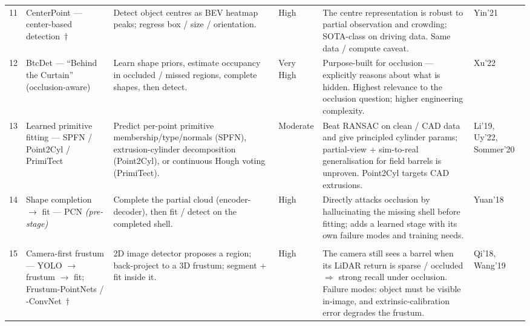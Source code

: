 \documentclass[10pt,a4paper]{article}
\newcommand{\stars}[1]{%
  \ifcase#1\or
  \ding{72}\ding{73}\ding{73}\ding{73}\ding{73}\or
  \ding{72}\ding{72}\ding{73}\ding{73}\ding{73}\or
  \ding{72}\ding{72}\ding{72}\ding{73}\ding{73}\or
  \ding{72}\ding{72}\ding{72}\ding{72}\ding{73}\or
  \ding{72}\ding{72}\ding{72}\ding{72}\ding{72}\fi}
\begin{document}
\begin{landscape}
\begin{longtable}{@{}R{0.5cm} R{3.3cm} R{6.7cm} R{2.2cm} R{7.0cm} R{2.5cm}@{}}
11 & CenterPoint --- center-based detection~$\dagger$ &
Detect object centres as BEV heatmap peaks; regress box / size / orientation. &
\stars{4}\newline High &
The centre representation is robust to partial observation and crowding; SOTA-class on driving data. Same data / compute caveat. &
Yin'21\\

12 & BtcDet --- ``Behind the Curtain'' (occlusion-aware) &
Learn shape priors, estimate occupancy in occluded / missed regions, complete shapes, then detect. &
\stars{5}\newline Very High &
Purpose-built for occlusion --- explicitly reasons about what is hidden. Highest relevance to the occlusion question; higher engineering complexity. &
Xu'22\\

13 & Learned primitive fitting --- SPFN / Point2Cyl / PrimiTect &
Predict per-point primitive membership/type/normals (SPFN), extrusion-cylinder decomposition (Point2Cyl), or continuous Hough voting (PrimiTect). &
\stars{3}\newline Moderate &
Beat RANSAC on clean / CAD data and give principled cylinder params; partial-view + sim-to-real generalisation for field barrels is unproven. Point2Cyl targets CAD extrusions. &
Li'19, Uy'22, Sommer'20\\

14 & Shape completion $\to$ fit --- PCN \emph{(pre-stage)} &
Complete the partial cloud (encoder-decoder), then fit / detect on the completed shell. &
\stars{4}\newline High &
Directly attacks occlusion by hallucinating the missing shell before fitting; adds a learned stage with its own failure modes and training needs. &
Yuan'18\\

\\
15 & Camera-first frustum --- YOLO $\to$ frustum $\to$ fit; Frustum-PointNets / -ConvNet~$\dagger$ &
2D image detector proposes a region; back-project to a 3D frustum; segment + fit inside it. &
\stars{4}\newline High &
The camera still sees a barrel when its LiDAR return is sparse / occluded $\Rightarrow$ strong recall under occlusion. Failure modes: object must be visible in-image, and extrinsic-calibration error degrades the frustum. &
Qi'18, Wang'19\\


\end{longtable}
\end{landscape}
\end{document}
